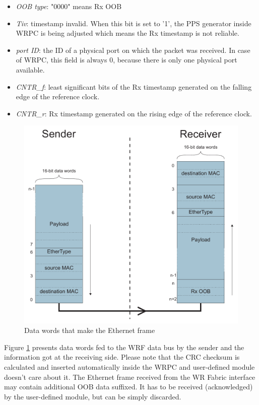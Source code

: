 \begin{itemize}
  \item[] \emph{OOB type}: "0000" means Rx OOB
  \item[] \emph{Tiv}: timestamp invalid. When this bit is set to '1', the PPS
    generator inside WRPC is being adjusted which means the Rx timestamp is not
    reliable.
  \item[] \emph{port ID}: the ID of a physical port on which the packet was
    received. In case of WRPC, this field is always 0, because there is only one
    physical port available.
  \item[] \emph{CNTR\_f}: least significant bits of the Rx timestamp generated on
    the falling edge of the reference clock.
  \item[] \emph{CNTR\_r}: Rx timestamp generated on the rising edge of the reference
    clock.
\end{itemize}

\begin{figure}
  \begin{center}
    \includegraphics[width=.6\textwidth]{fig/basic_wrf_data.pdf}
    \caption{Data words that make the Ethernet frame}
    \label{fig:fabric:simple_data}
  \end{center}
\end{figure}

Figure \ref{fig:fabric:simple_data} presents data words fed to the WRF
data bus by the sender and the information got at the receiving side. Please
note that the CRC checksum is calculated and inserted automatically inside the
WRPC and user-defined module doesn't care about it. The Ethernet frame received
from the WR Fabric interface may contain additional OOB data suffixed. It has to
be received (acknowledged) by the user-defined module, but can be simply discarded.

